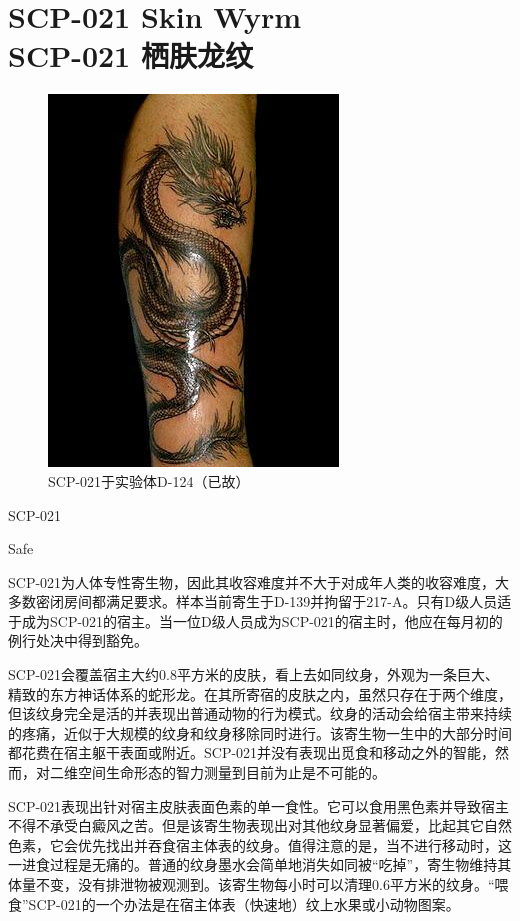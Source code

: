 \chapter[SCP-021 栖肤龙纹]{
    SCP-021 Skin Wyrm\\
    SCP-021 栖肤龙纹
}

\label{chap:SCP-021}

\begin{figure}[H]
    \centering
    \includegraphics[width=0.5\linewidth]{images/SCP.021.jpg}
    \caption*{SCP-021于实验体D-124（已故）}
\end{figure}

 SCP-021

 Safe

 SCP-021为人体专性寄生物，因此其收容难度并不大于对成年人类的收容难度，大多数密闭房间都满足要求。样本当前寄生于D-139并拘留于217-A。只有D级人员适于成为SCP-021的宿主。当一位D级人员成为SCP-021的宿主时，他应在每月初的例行处决中得到豁免。

 SCP-021会覆盖宿主大约0.8平方米的皮肤，看上去如同纹身，外观为一条巨大、精致的东方神话体系的蛇形龙。在其所寄宿的皮肤之内，虽然只存在于两个维度，但该纹身完全是活的并表现出普通动物的行为模式。纹身的活动会给宿主带来持续的疼痛，近似于大规模的纹身和纹身移除同时进行。该寄生物一生中的大部分时间都花费在宿主躯干表面或附近。SCP-021并没有表现出觅食和移动之外的智能，然而，对二维空间生命形态的智力测量到目前为止是不可能的。

SCP-021表现出针对宿主皮肤表面色素的单一食性。它可以食用黑色素并导致宿主不得不承受白癜风之苦。但是该寄生物表现出对其他纹身显著偏爱，比起其它自然色素，它会优先找出并吞食宿主体表的纹身。值得注意的是，当不进行移动时，这一进食过程是无痛的。普通的纹身墨水会简单地消失如同被“吃掉”，寄生物维持其体量不变，没有排泄物被观测到。该寄生物每小时可以清理0.6平方米的纹身。“喂食”SCP-021的一个办法是在宿主体表（快速地）纹上水果或小动物图案。

